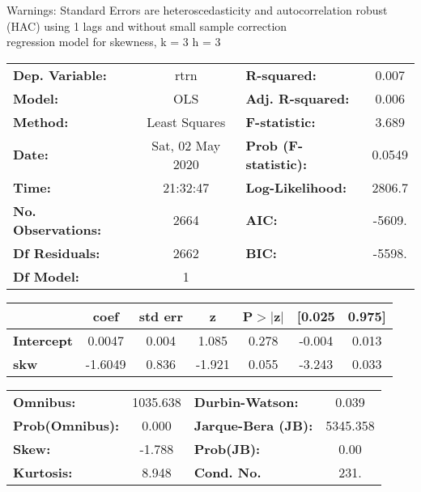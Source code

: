Warnings: \newline
 [1] Standard Errors are heteroscedasticity and autocorrelation robust (HAC) using 1 lags and without small sample correction\\ 

regression model for skewness, k = 3 h = 3\begin{center}
\begin{tabular}{lclc}
\toprule
\textbf{Dep. Variable:}    &       rtrn       & \textbf{  R-squared:         } &     0.007   \\
\textbf{Model:}            &       OLS        & \textbf{  Adj. R-squared:    } &     0.006   \\
\textbf{Method:}           &  Least Squares   & \textbf{  F-statistic:       } &     3.689   \\
\textbf{Date:}             & Sat, 02 May 2020 & \textbf{  Prob (F-statistic):} &   0.0549    \\
\textbf{Time:}             &     21:32:47     & \textbf{  Log-Likelihood:    } &    2806.7   \\
\textbf{No. Observations:} &        2664      & \textbf{  AIC:               } &    -5609.   \\
\textbf{Df Residuals:}     &        2662      & \textbf{  BIC:               } &    -5598.   \\
\textbf{Df Model:}         &           1      & \textbf{                     } &             \\
\bottomrule
\end{tabular}
\begin{tabular}{lcccccc}
                   & \textbf{coef} & \textbf{std err} & \textbf{z} & \textbf{P$> |$z$|$} & \textbf{[0.025} & \textbf{0.975]}  \\
\midrule
\textbf{Intercept} &       0.0047  &        0.004     &     1.085  &         0.278        &       -0.004    &        0.013     \\
\textbf{skw}       &      -1.6049  &        0.836     &    -1.921  &         0.055        &       -3.243    &        0.033     \\
\bottomrule
\end{tabular}
\begin{tabular}{lclc}
\textbf{Omnibus:}       & 1035.638 & \textbf{  Durbin-Watson:     } &    0.039  \\
\textbf{Prob(Omnibus):} &   0.000  & \textbf{  Jarque-Bera (JB):  } & 5345.358  \\
\textbf{Skew:}          &  -1.788  & \textbf{  Prob(JB):          } &     0.00  \\
\textbf{Kurtosis:}      &   8.948  & \textbf{  Cond. No.          } &     231.  \\
\bottomrule
\end{tabular}
\end{center}

